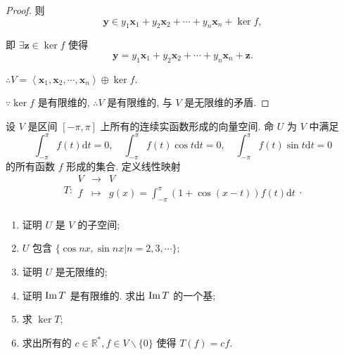 \documentclass[color=black,device=normal,lang=cn,mode=geye]{elegantnote}
\begin{document}
\begin{proof}
    则
    \[\boldsymbol{y}\in y_1\boldsymbol{x}_1+y_2\boldsymbol{x}_2+\cdots+y_n\boldsymbol{x}_n+\ker f,\]

    即 $\exists\boldsymbol{z}\in\ker f$ 使得
    \[\boldsymbol{y}=y_1\boldsymbol{x}_1+y_2\boldsymbol{x}_2+\cdots+y_n\boldsymbol{x}_n+\boldsymbol{z}.\]

    $\therefore V=\left<\boldsymbol{x}_1,\boldsymbol{x}_2,\cdots,\boldsymbol{x}_n\right>\oplus\ker f$.
    
    $\because\ker f$ 是有限维的, $\therefore V$ 是有限维的, 与 $V$ 是无限维的矛盾.
\end{proof}
\begin{exercisec}[2.1.10]
    设 $V$ 是区间 $[-\pi,\pi]$ 上所有的连续实函数形成的向量空间. 命 $U$ 为 $V$ 中满足
    \begin{equation}\label{eq6.1}
        \int_{-\pi}^{\pi}f(t)\mathrm{d}t=0,\quad\int_{-\pi}^{\pi}f(t)\cos t\mathrm{d}t=0,\quad\int_{-\pi}^{\pi}f(t)\sin t\mathrm{d}t=0
    \end{equation}
    的所有函数 $f$ 形成的集合. 定义线性映射
    \[T:\begin{array}{rcl}
        V & \to & V \\
        f & \mapsto & g(x)=\int_{-\pi}^{\pi}(1+\cos(x-t))f(t)\mathrm{d}t \\
    \end{array}.\]
    \begin{enumerate}
        \def\labelenumi{(\arabic{enumi})}
        \item 证明 $U$ 是 $V$ 的子空间;
        \item $U$ 包含 $\{\cos nx,\sin nx|n=2,3,\cdots\}$;
        \item 证明 $U$ 是无限维的;
        \item 证明 $\operatorname{Im} T$ 是有限维的. 求出 $\operatorname{Im} T$ 的一个基;
        \item 求 $\ker T$;
        \item 求出所有的 $c\in\mathbb{R}^*,f\in V\backslash\{0\}$ 使得 $T(f)=cf$.
    \end{enumerate}
\end{exercisec}
\end{document}
